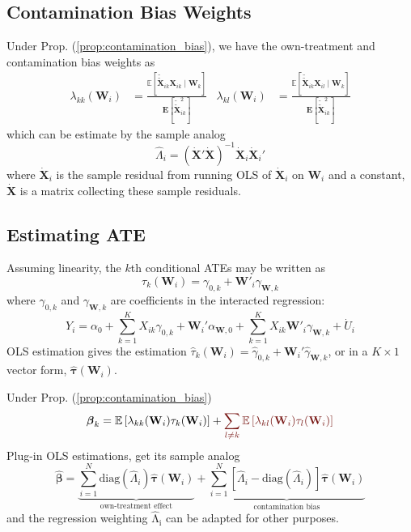 \documentclass[twoside]{article}
\begin{document}
\subsection{Contamination Bias Weights}
Under Prop. (\ref{prop:contamination_bias}), we have the own-treatment and contamination bias weights as
\begin{align*}
    \lambda_{kk}(\mathbf{W}_i) &= \frac{\mathbb{E}\left[\tilde{\tilde{\mathbf{X}}}_{ik}\mathbf{X}_{ik}\mid \mathbf{W}_k\right]}{\mathbf{E}\left[\tilde{\tilde{\mathbf{X}}}^2_{ik}\right]} & \lambda_{kl}(\mathbf{W}_i) &= \frac{\mathbb{E}\left[\tilde{\tilde{\mathbf{X}}}_{ik}\mathbf{X}_{il}\mid \mathbf{W}_k\right]}{\mathbf{E}\left[\tilde{\tilde{\mathbf{X}}}^2_{ik}\right]}
\end{align*}
which can be estimate by the sample analog
\begin{equation*}
    \hat{\Lambda}_i = \left(\dot{\mathbf{X}}'\dot{\mathbf{X}}\right)^{-1} \dot{\mathbf{X}}_i \dot{\mathbf{X}}_i'
\end{equation*}
where $\dot{\mathbf{X}}_i$ is the sample residual from running OLS of $\dot{\mathbf{X}}_i$ on $\mathbf{W}_i$ and a constant, $\dot{\mathbf{X}}$ is a matrix collecting these sample residuals.

\subsection{Estimating ATE}
Assuming linearity, the $k$th conditional ATEs may be written as
$$
\tau_k(\mathbf{W}_i) = \gamma_{0,k} + \mathbf{W}'_i\gamma_{\mathbf{W},k}
$$
where $\gamma_{0,k}$ and $\gamma_{\mathbf{W},k}$ are coefficients in the interacted regression:
\begin{equation}\label{eq:interacted_model}
    Y_i = \alpha_0 + \sum^K_{k=1}X_{ik}\gamma_{0,k} + \mathbf{W}_i'\alpha_{\mathbf{W},0} + \sum^K_{k=1}X_{ik}\mathbf{W}'_i\gamma_{\mathbf{W},k} + \dot{U}_i
\end{equation}
OLS estimation gives the estimation $\hat{\tau}_k(\mathbf{W}_i) = \hat{\gamma}_{0,k} + \mathbf{W}_i'\hat{\gamma}_{\mathbf{W},k}$, or in a $K\times 1$ vector form, $\hat{\boldsymbol{\tau}}(\mathbf{W}_i)$.

Under Prop. (\ref{prop:contamination_bias}) 
$$
\boldsymbol{\beta}_k = \mathbb{E}\left[ \lambda_{kk}(\mathbf{W}_i)\tau_k(\mathbf{W}_i) \right] + \textcolor{myred}{\sum_{l\neq k}\mathbb{E}\left[\lambda_{kl}(\mathbf{W}_i)\tau_l(\mathbf{W}_i)\right] }
$$
Plug-in OLS estimations, get its sample analog
\begin{equation}
    \hat{\boldsymbol{\beta}} = \underbrace{\sum^N_{i=1}\mathrm{diag}(\hat{\Lambda}_i) \hat{\boldsymbol{\tau}}(\mathbf{W}_i)}_{\text{own-treatment effect}} + \underbrace{\sum^N_{i=1}\left[\hat{\Lambda}_i - \mathrm{diag}(\hat{\Lambda}_i)\right]\hat{\boldsymbol{\tau}}(\mathbf{W}_i)}_{\text{contamination bias}}
\end{equation}
and the regression weighting $\mathrm{\hat{\Lambda}_i}$ can be adapted for other purposes.
\end{document}
